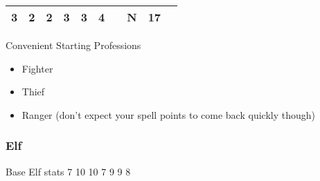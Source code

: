 \documentclass[12pt]{article}
\newcommand{\WviiTwoColumnSetup}{\raggedcolumns\RaggedRight}
\begin{document}
\begin{longtable}[]{@{}llllllllll@{}}
\begin{minipage}[t]{0.06\columnwidth}\raggedright\strut
3
\strut\end{minipage} &
\begin{minipage}[t]{0.06\columnwidth}\raggedright\strut
2
\strut\end{minipage} &
\begin{minipage}[t]{0.06\columnwidth}\raggedright\strut
2
\strut\end{minipage} &
\begin{minipage}[t]{0.06\columnwidth}\raggedright\strut
3
\strut\end{minipage} &
\begin{minipage}[t]{0.06\columnwidth}\raggedright\strut
3
\strut\end{minipage} &
\begin{minipage}[t]{0.06\columnwidth}\raggedright\strut
4
\strut\end{minipage} &
\begin{minipage}[t]{0.06\columnwidth}\raggedright\strut
\strut\end{minipage} &
\begin{minipage}[t]{0.07\columnwidth}\raggedright\strut
N
\strut\end{minipage} &
\begin{minipage}[t]{0.08\columnwidth}\raggedright\strut
17
\strut\end{minipage}\tabularnewline
\bottomrule
\end{longtable}

Convenient Starting Professions

\begin{multicols}{2}\WviiTwoColumnSetup
\begin{itemize}
\item
  Fighter
\item
  Thief
\item
  Ranger (don't expect your spell points to come back quickly though)
\end{itemize}
\end{multicols}

\subsubsection{Elf}\label{elf}

Base Elf stats 7 10 10 7 9 9 8
\end{document}
